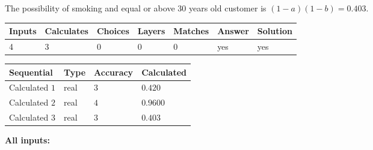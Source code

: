 \documentclass[12pt]{article}
\begin{document}
 
 
\noindent{}
 
 

 
 
 
\noindent{}
 
 

The possibility of  %
smoking and  %
equal or above 30 years old
customer is $ (1-a)(1-b) =  %
0.403 $.
 
 
\noindent{}
 
 

 
\vspace{0.3in}
   
   
   
   
\noindent\begin{tabular}{|l|l|l|l|l|l|l|}
 \hline
Inputs & Calculates & Choices & Layers & Matches & Answer & Solution \\ \hline
           4  & 
           3  & 
           0
  & 
           0  & 
           0  & 
  yes & 
  yes 
  \\ \hline
 \end{tabular}
   
   
   
   
\noindent{}
   
   
  
  
\noindent\begin{tabular}{|l|l|l|l|}
\hline
 Sequential & Type & Accuracy & Calculated \\ 
\hline
 
 
  Calculated $            1 $ & real & $            3  $ & 
 $ 0.420 $ 
 \\  \hline  
 
 
  Calculated $            2 $ & real & $            4  $ & 
 $ 0.9600 $ 
 \\  \hline  
 
 
  Calculated $            3 $ & real & $            3  $ & 
 $ 0.403 $ 
 \\  \hline  
 \end{tabular}
   
   
   
   
\noindent\vspace{0.1in}\hspace{-0.08in} {\textbf{\Large{All inputs: }}}
   
\end{document}
